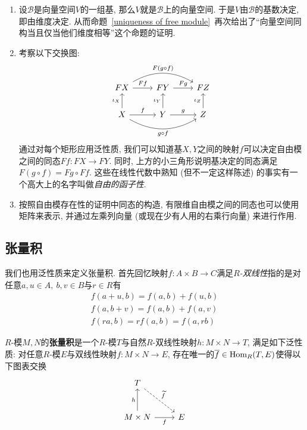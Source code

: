 \begin{eg}
    \begin{enumerate}[(1)]
        \item 设$\mathcal{B}$是向量空间$V$的一组基, 那么$V$就是$\mathcal{B}$上的向量空间.
        于是$V$由$\mathcal{B}$的基数决定, 即由维度决定.
        从而命题~\ref{uniqueness of free module}~再次给出了``向量空间同构当且仅当他们维度相等''这个命题的证明.
        \item 考察以下交换图:
        \[\begin{tikzcd}
            FX \arrow[rr, bend left, "F(g\circ f)"] \arrow[r, "Ff"] & FY \arrow[r, "Fg"] & FZ\\
            X \arrow[u, "\iota_X"] \arrow[r, "f"] \arrow[rr,bend right, "g\circ f"'] & Y \arrow[u, "\iota_Y"] \arrow[r, "g"] & Z \arrow[u, "\iota_Z"]
        \end{tikzcd}\]
        通过对每个矩形应用泛性质, 我们可以知道基$X,Y$之间的映射$f$可以决定自由模之间的同态$Ff:FX\to FY$.
        同时, 上方的小三角形说明基决定的同态满足$F(g\circ f)=Fg\circ Ff$.
        这些在线性代数中熟知 (但不一定这样陈述) 的事实有一个高大上的名字叫做\textit{自由的函子性}.
        \item 按照自由模存在性的证明中同态的构造, 有限维自由模之间的同态也可以使用矩阵来表示, 并通过左乘列向量 (或现在少有人用的右乘行向量) 来进行作用.
    \end{enumerate}
\end{eg}

\subsection*{张量积}
我们也用泛性质来定义张量积.
首先回忆映射$f:A\times B\to C$满足\textit{$R$-双线性}指的是对任意$a,u\in A,\ b,v\in B$与$r\in R$有
\begin{gather*}
    f(a+u,b)=f(a,b)+f(u,b)\\
    f(a,b+v)=f(a,b)+f(a,v)\\
    f(ra,b)=rf(a,b)=f(a,rb)
\end{gather*}

\begin{defn}
    $R$-模$M,N$的\textbf{张量积}是一个$R$-模$T$与自然$R$-双线性映射$h:M\times N\to T$, 满足如下泛性质:
    对任意$R$-模$E$与双线性映射$f:M\times N\to E$, 存在唯一的$\overline{f}\in\operatorname*{Hom}_R(T,E)$使得以下图表交换
    \[\begin{tikzcd}[row sep=large]
        T \arrow[rd, dashed, "\widetilde{f}"] & \\
        M\times N\arrow[r, "f"'] \arrow[u, "h"] & E
    \end{tikzcd}\]
\end{defn}


